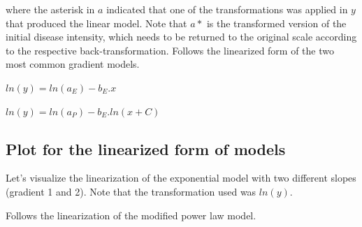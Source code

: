 \documentclass[
  letterpaper,
  DIV=11,
  numbers=noendperiod]{scrreprt}
\begin{document}
where the asterisk in \(a\) indicated that one of the transformations
was applied in \(y\) that produced the linear model. Note that \(a*\) is
the transformed version of the initial disease intensity, which needs to
be returned to the original scale according to the respective
back-transformation. Follows the linearized form of the two most common
gradient models.

\(ln(y) = ln(a_{E}) - b_{E}. x\)

\(ln(y) = ln(a_{P}) - b_{E}. ln(x+C)\)

\hypertarget{plot-for-the-linearized-form-of-models}{%
\subsection{Plot for the linearized form of
models}\label{plot-for-the-linearized-form-of-models}}

Let's visualize the linearization of the exponential model with two
different slopes (gradient 1 and 2). Note that the transformation used
was \(ln(y)\).

Follows the linearization of the modified power law model.
\end{document}
